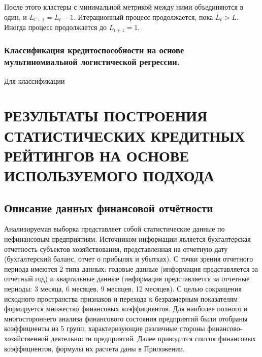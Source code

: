 \documentclass[14pt,a4paper]{extarticle}
\begin{document}
После этого кластеры с минимальной метрикой между ними объединяются в один, и $L_{t+1} = L_{t} - 1$. Итерационный процесс продолжается, пока $L_{t} > L$. Иногда процесс продолжается до $L_{t+1} = 1$.

\subsubsection{Классификация кредитоспособности на основе мультиномиальной 
    логистической регрессии.}

Для классификации 

\clearpage

\section{РЕЗУЛЬТАТЫ ПОСТРОЕНИЯ СТАТИСТИЧЕСКИХ КРЕДИТНЫХ РЕЙТИНГОВ НА ОСНОВЕ ИСПОЛЬЗУЕМОГО ПОДХОДА}

\subsection{Описание данных финансовой отчётности}

Анализируемая выборка представляет собой статистические данные по нефинансовым предприятиям. Источником информации является бухгалтерская отчетность субъектов хозяйствования, представленная на отчетную дату (бухгалтерский баланс, отчет о прибылях и убытках). С точки зрения отчетного периода имеются 2 типа данных: годовые данные (информация представляется за отчетный год) и квартальные данные (информация представляется за отчетные периоды: 3 месяца, 6 месяцев, 9 месяцев, 12 месяцев). С целью сокращения исходного пространства признаков и перехода к безразмерным показателям формируется множество финансовых коэффициентов. Для наиболее полного и многостороннего анализа финансового состояния предприятий были отобраны коэффициенты из 5 групп, характеризующие различные стороны финансово-хозяйственной деятельности предприятий. Далее приводится список финансовых коэффициентов, формулы их расчета даны в Приложении.
\end{document}
